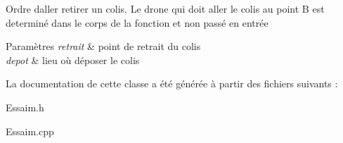 Ordre d\textquotesingle{}aller retirer un colis. Le drone qui doit aller le colis au point B est determiné dans le corps de la fonction et non passé en entrée 
\begin{DoxyParams}{Paramètres}
{\em retrait} & point de retrait du colis \\
\hline
{\em depot} & lieu où déposer le colis \\
\hline
\end{DoxyParams}


La documentation de cette classe a été générée à partir des fichiers suivants \+:\begin{DoxyCompactItemize}
\item 
Essaim.\+h\item 
Essaim.\+cpp\end{DoxyCompactItemize}
